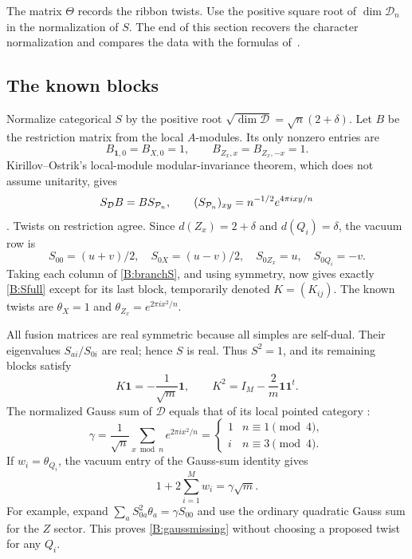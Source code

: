 \documentclass[11pt]{article}
\newcommand{\one}{\mathbf1}\newcommand{\D}{\mathcal D}\newcommand{\Dcat}{\mathcal D}
\numberwithin{equation}{section}
\begin{document}
The matrix $\Theta$ records the ribbon twists. Use the positive square root of $\dim\D_n$ in the normalization of $S$. The end of this section recovers the character normalization and compares the data with the formulas of~\cite{A:EG,B:EG11}.

\subsection{The known blocks}
Normalize categorical $S$ by the positive root $\sqrt{\dim\D}=\sqrt n(2+\delta)$. Let $B$ be the restriction matrix from the local $A$-modules. Its only nonzero entries are
\[
 B_{\one,0}=B_{X,0}=1,\qquad B_{Z_x,x}=B_{Z_x,-x}=1.
\]
Kirillov--Ostrik's local-module modular-invariance theorem, which does not assume unitarity, gives
\begin{equation}\label{B:branchS}
 S_{\D}B=B S_{\Pcat_n},\qquad
 (S_{\Pcat_n})_{xy}=n^{-1/2}e^{4\pi ixy/n}
\end{equation}
\cite[Theorems 4.1 and 4.5]{A:KO}. Twists on restriction agree. Since $d(Z_x)=2+\delta$ and $d(Q_i)=\delta$, the vacuum row is
\[
 S_{00}=(u+v)/2,\quad S_{0X}=(u-v)/2,\quad
 S_{0Z_x}=u,\quad S_{0Q_i}=-v.
\]
Taking each column of \eqref{B:branchS}, and using symmetry, now gives exactly \eqref{B:Sfull} except for its last block, temporarily denoted $K=(K_{ij})$. The known twists are $\theta_X=1$ and $\theta_{Z_x}=e^{2\pi ix^2/n}$.

All fusion matrices are real symmetric because all simples are self-dual. Their eigenvalues $S_{ai}/S_{0i}$ are real; hence $S$ is real. Thus $S^2=1$, and its remaining blocks satisfy
\begin{equation}\label{B:Krelations}
 K\mathbf1=-\frac1{\sqrt m}\mathbf1,\qquad
 K^2=I_M-\frac2m\mathbf1\mathbf1^t.
\end{equation}
The normalized Gauss sum of $\D$ equals that of its local pointed category \cite[Theorem 4.5]{A:KO}:
\[
 \gamma=\frac1{\sqrt n}\sum_{x\bmod n}e^{2\pi ix^2/n}
 =\begin{cases}1&n\equiv1\pmod4,\\ i&n\equiv3\pmod4.\end{cases}
\]
If $w_i=\theta_{Q_i}$, the vacuum entry of the Gauss-sum identity gives
\begin{equation}\label{B:gaussmissing}
 1+2\sum_{i=1}^{M}w_i=\gamma\sqrt m.
\end{equation}
For example, expand $\sum_a S_{0a}^2\theta_a=\gamma S_{00}$ and use the ordinary quadratic Gauss sum for the $Z$ sector. This proves \eqref{B:gaussmissing} without choosing a proposed twist for any $Q_i$.
\end{document}
